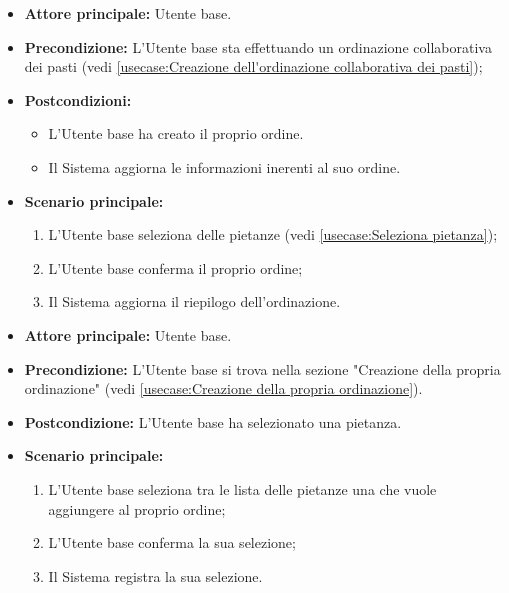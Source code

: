 \label{usecase:Creazione della propria ordinazione}
\begin{itemize}
	\item \textbf{Attore principale:} Utente base.

	\item \textbf{Precondizione:} L'Utente base sta effettuando un ordinazione collaborativa dei pasti (vedi \autoref{usecase:Creazione dell'ordinazione collaborativa dei pasti});

	\item \textbf{Postcondizioni:}
	      \begin{itemize}
		      \item L'Utente base ha creato il proprio ordine.
		      \item Il Sistema aggiorna le informazioni inerenti al suo ordine.
	      \end{itemize}

	\item \textbf{Scenario principale:}
	      \begin{enumerate}
		      \item L'Utente base seleziona delle pietanze (vedi \autoref{usecase:Seleziona pietanza});
		      \item L'Utente base conferma il proprio ordine;
		      \item Il Sistema aggiorna il riepilogo dell'ordinazione.
	      \end{enumerate}
\end{itemize}


\label{usecase:Seleziona pietanza}
\begin{itemize}
	\item \textbf{Attore principale:} Utente base.

	\item \textbf{Precondizione:} L'Utente base si trova nella sezione "Creazione della propria ordinazione" (vedi \autoref{usecase:Creazione della propria ordinazione}).

	\item \textbf{Postcondizione:} L'Utente base ha selezionato una pietanza.

	\item \textbf{Scenario principale:}
	      \begin{enumerate}
		      \item L'Utente base seleziona tra le lista delle pietanze una che vuole aggiungere al proprio ordine;
		      \item L'Utente base conferma la sua selezione;
		      \item Il Sistema registra la sua selezione.
	      \end{enumerate}
\end{itemize}

